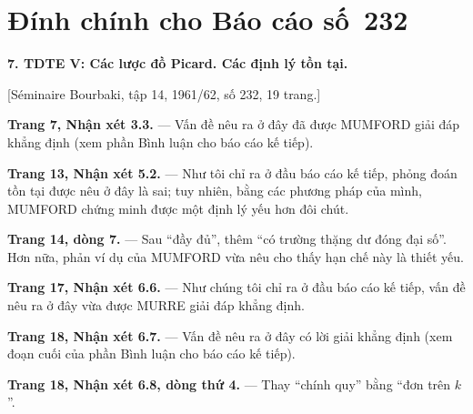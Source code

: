 \clearpage
\chapter*{Đính chính cho Báo cáo số~232}

\noindent\textbf{7. TDTE V: Các lược đồ Picard. Các định lý tồn tại.}

\begin{center}
[Séminaire Bourbaki, tập 14, 1961/62, số 232, 19 trang.]
\end{center}

\noindent\textbf{Trang 7, Nhận xét 3.3.} --- Vấn đề nêu ra ở đây đã được
MUMFORD giải đáp khẳng định (xem phần Bình luận cho báo cáo kế tiếp).

\noindent\textbf{Trang 13, Nhận xét 5.2.} --- Như tôi chỉ ra ở đầu báo cáo kế
tiếp, phỏng đoán tồn tại được nêu ở đây là sai; tuy nhiên, bằng các phương pháp
của mình, MUMFORD chứng minh được một định lý yếu hơn đôi chút.

\noindent\textbf{Trang 14, dòng 7.} --- Sau ``đầy đủ'', thêm ``có trường thặng
dư đóng đại số''. Hơn nữa, phản ví dụ của MUMFORD vừa nêu cho thấy hạn chế này
là thiết yếu.

\noindent\textbf{Trang 17, Nhận xét 6.6.} --- Như chúng tôi chỉ ra ở đầu báo
cáo kế tiếp, vấn đề nêu ra ở đây vừa được MURRE giải đáp khẳng định.

\noindent\textbf{Trang 18, Nhận xét 6.7.} --- Vấn đề nêu ra ở đây có lời giải
khẳng định (xem đoạn cuối của phần Bình luận cho báo cáo kế tiếp).

\noindent\textbf{Trang 18, Nhận xét 6.8, dòng thứ 4.} --- Thay ``chính quy''
bằng ``đơn trên $k$''.

\par
